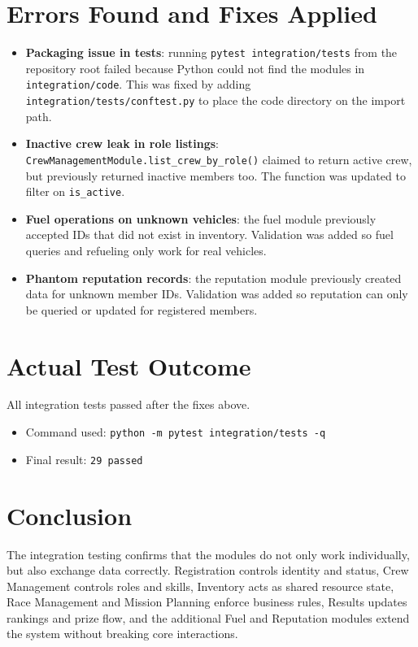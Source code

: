 \documentclass[12pt]{article}
\begin{document}
\section{Errors Found and Fixes Applied}
\begin{itemize}
\item \textbf{Packaging issue in tests}: running \texttt{pytest integration/tests} from the repository root failed because Python could not find the modules in \texttt{integration/code}. This was fixed by adding \texttt{integration/tests/conftest.py} to place the code directory on the import path.
\item \textbf{Inactive crew leak in role listings}: \texttt{CrewManagementModule.list\_crew\_by\_role()} claimed to return active crew, but previously returned inactive members too. The function was updated to filter on \texttt{is\_active}.
\item \textbf{Fuel operations on unknown vehicles}: the fuel module previously accepted IDs that did not exist in inventory. Validation was added so fuel queries and refueling only work for real vehicles.
\item \textbf{Phantom reputation records}: the reputation module previously created data for unknown member IDs. Validation was added so reputation can only be queried or updated for registered members.
\end{itemize}

\section{Actual Test Outcome}
All integration tests passed after the fixes above.

\begin{itemize}
\item Command used: \texttt{python -m pytest integration/tests -q}
\item Final result: \texttt{29 passed}
\end{itemize}

\section{Conclusion}
The integration testing confirms that the modules do not only work individually, but also exchange data correctly. Registration controls identity and status, Crew Management controls roles and skills, Inventory acts as shared resource state, Race Management and Mission Planning enforce business rules, Results updates rankings and prize flow, and the additional Fuel and Reputation modules extend the system without breaking core interactions.
\end{document}

